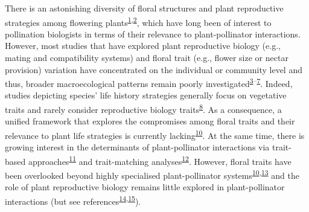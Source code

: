 \documentclass[12pt,a4paper,]{article}
\begin{document}
\doublespacing
\vspace{5mm} \normalsize

There is an astonishing diversity of floral structures and plant
reproductive strategies among flowering
plants\textsuperscript{\protect\hyperlink{ref-barrett2002}{1},\protect\hyperlink{ref-schiestl2013}{2}},
which have long been of interest to pollination biologists in terms of
their relevance to plant-pollinator interactions. However, most studies
that have explored plant reproductive biology (e.g., mating and
compatibility systems) and floral trait (e.g., flower size or nectar
provision) variation have concentrated on the individual or community
level and thus, broader macroecological patterns remain poorly
investigated\textsuperscript{\protect\hyperlink{ref-carvalheiro2014}{3}--\protect\hyperlink{ref-grossenbacher2017}{7}}.
Indeed, studies depicting species' life history strategies generally
focus on vegetative traits and rarely consider reproductive biology
traits\textsuperscript{\protect\hyperlink{ref-salguero2016}{8}}. As a
consequence, a unified framework that explores the compromises among
floral traits and their relevance to plant life strategies is currently
lacking\textsuperscript{\protect\hyperlink{ref-roddy2021}{10}}. At the
same time, there is growing interest in the determinants of
plant-pollinator interactions via trait-based
approaches\textsuperscript{\protect\hyperlink{ref-fenster2004}{11}} and
trait-matching
analyses\textsuperscript{\protect\hyperlink{ref-bartomeus2016}{12}}.
However, floral traits have been overlooked beyond highly specialised
plant-pollinator
systems\textsuperscript{\protect\hyperlink{ref-roddy2021}{10},\protect\hyperlink{ref-dellinger2020}{13}}
and the role of plant reproductive biology remains little explored in
plant-pollinator interactions (but see
references\textsuperscript{\protect\hyperlink{ref-tur2013}{14},\protect\hyperlink{ref-devaux2014}{15}}).
\end{document}
